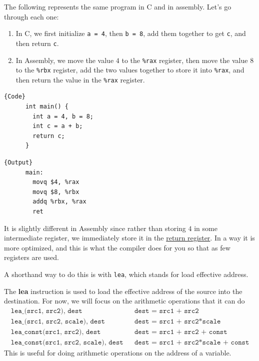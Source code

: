   \begin{example}
    \label{ex:basic-arithmetic-function}
    The following represents the same program in C and in assembly. Let's go through each one: 
    \begin{enumerate}
      \item In C, we first initialize \texttt{a = 4}, then \texttt{b = 8}, add them together to get \texttt{c}, and then return \texttt{c}.
      \item In Assembly, we move the value $4$ to the \texttt{\%rax} register, then move the value $8$ to the \texttt{\%rbx} register, add the two values together to store it into \texttt{\%rax}, and then return the value in the \texttt{\%rax} register.
    \end{enumerate}
    \noindent\begin{minipage}{.5\textwidth}
    \begin{lstlisting}[]{Code}
      int main() {
        int a = 4, b = 8; 
        int c = a + b; 
        return c; 
      }
    \end{lstlisting}
    \end{minipage}
    \hfill
    \begin{minipage}{.49\textwidth}
    \begin{lstlisting}[]{Output}
      main:
        movq $4, %rax
        movq $8, %rbx
        addq %rbx, %rax
        ret
    \end{lstlisting}
    \end{minipage}
    It is slightly different in Assembly since rather than storing $4$ in some intermediate register, we immediately store it in the \hyperref[def:return-register]{return register}. In a way it is more optimized, and this is what the compiler does for you so that as few registers are used. 
  \end{example}

  A shorthand way to do this is with \texttt{lea}, which stands for load effective address. 

  \begin{definition}
    \label{def:load-effective-address}
    The \textbf{lea} instruction is used to load the effective address of the source into the destination. For now, we will focus on the arithmetic operations that it can do
    \begin{align*}
      \texttt{lea\_ (src1, src2), dest} && \texttt{dest = src1 + src2}  \\ 
      \texttt{lea\_ (src1, src2, scale), dest} && \texttt{dest = src1 + src2*scale}  \\ 
      \texttt{lea\_ const(src1, src2), dest} && \texttt{dest = src1 + src2 + const} \\ 
      \texttt{lea\_ const(src1, src2, scale), dest} && \texttt{dest = src1 + src2*scale + const}
    \end{align*}
    This is useful for doing arithmetic operations on the address of a variable.
  \end{definition}

